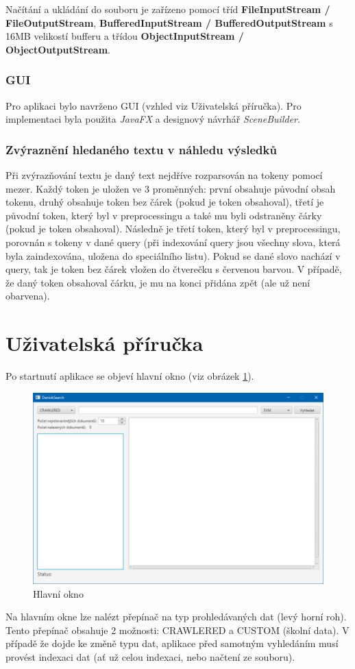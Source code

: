 \documentclass[12pt, a4paper]{article}
\begin{document}
Načítání a ukládání do souboru je zařízeno pomocí tříd \textbf{FileInputStream / FileOutputStream}, \textbf{BufferedInputStream / BufferedOutputStream} s 16MB velikostí bufferu a třídou \textbf{ObjectInputStream / ObjectOutputStream}.
\subsubsection{GUI}
Pro aplikaci bylo navrženo GUI (vzhled viz Uživatelská příručka). Pro implementaci byla použita \textit{JavaFX} a designový návrhář \textit{SceneBuilder}.
\subsubsection{Zvýraznění hledaného textu v náhledu výsledků}
Při zvýrazňování textu je daný text nejdříve rozparsován na tokeny pomocí mezer. Každý token je uložen ve 3 proměnných: první obsahuje původní obsah tokenu, druhý obsahuje token bez čárek (pokud je token obsahoval), třetí je původní token, který byl v preprocessingu a také mu byli odstraněny čárky (pokud je token obsahoval). Následně je třetí token, který byl v preprocessingu, porovnán s tokeny v dané query (při indexování query jsou všechny slova, která byla zaindexována, uložena do speciálního listu). Pokud se dané slovo nachází v query, tak je token bez čárek vložen do čtverečku s červenou barvou. V případě, že daný token obsahoval čárku, je mu na konci přidána zpět (ale už není obarvena).

\newpage

\section{Uživatelská příručka}
Po startnutí aplikace se objeví hlavní okno (viz obrázek \ref{fig:main}).
\begin{figure}[h]
	\centering
	\includegraphics[width=15cm]{img/main.png}
	\caption{Hlavní okno}
	\label{fig:main}
\end{figure}
Na hlavním okne lze nalézt přepínač na typ prohledávaných dat (levý horní roh). Tento přepínač obsahuje 2 možnosti: CRAWLERED a CUSTOM (školní data). V případě že dojde ke změně typu dat, aplikace před samotným vyhledáním musí provést indexaci dat (ať už celou indexaci, nebo načtení ze souboru).
\end{document}
